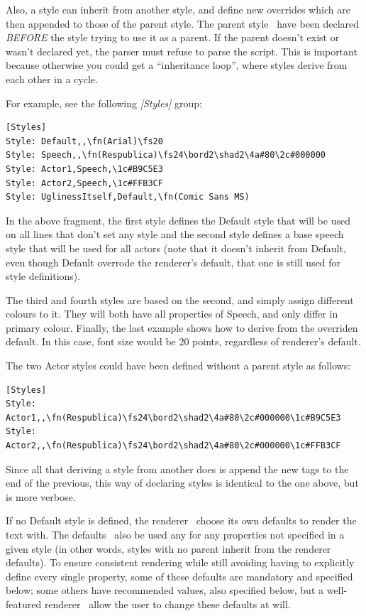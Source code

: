 \documentclass{spec}
\begin{document}
Also, a style can inherit from another style, and define new overrides which are then appended to those
of the parent style. The parent style \must\ have been declared \emph{BEFORE} the style trying to use
it as a parent. If the parent doesn't exist or wasn't declared yet, the parser must refuse to parse the
script. This is important because otherwise you could get a ``inheritance loop'', where styles derive from
each other in a cycle.

For example, see the following \emph{[Styles]} group:

\begin{verbatim}
[Styles]
Style: Default,,\fn(Arial)\fs20
Style: Speech,,\fn(Respublica)\fs24\bord2\shad2\4a#80\2c#000000
Style: Actor1,Speech,\1c#B9C5E3
Style: Actor2,Speech,\1c#FFB3CF
Style: UglinessItself,Default,\fn(Comic Sans MS)
\end{verbatim}

In the above fragment, the first style defines the Default style that will be used on all lines that
don't set any style and the second style defines a base speech style that will be used for all actors
(note that it doesn't inherit from Default, even though Default overrode the renderer's default, that
one is still used for style definitions).

The third and fourth styles are based on the second, and simply assign different colours to it. They
will both have all properties of Speech, and only differ in primary colour. Finally, the last example
shows how to derive from the overriden default. In this case, font size would be 20 points, regardless
of renderer's default.

The two Actor styles could have been defined without a parent style as follows:

\begin{verbatim}
[Styles]
Style: Actor1,,\fn(Respublica)\fs24\bord2\shad2\4a#80\2c#000000\1c#B9C5E3
Style: Actor2,,\fn(Respublica)\fs24\bord2\shad2\4a#80\2c#000000\1c#FFB3CF
\end{verbatim}

Since all that deriving a style from another does is append the new tags to the end of the previous,
this way of declaring styles is identical to the one above, but is more verbose.

If no Default style is defined, the renderer \must\ choose its own defaults to render the text with.
The defaults \must\ also be used any for any properties not specified in a given style (in other words,
styles with no parent inherit from the renderer defaults). To ensure consistent rendering while still 
avoiding having to explicitly define every single property, some of these defaults are mandatory and
specified below; some others have recommended values, also specified below, but a well-featured renderer
\may\ allow the user to change these defaults at will.
\end{document}
